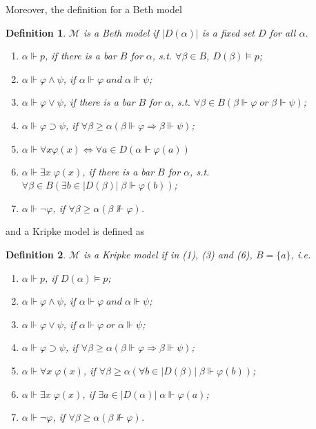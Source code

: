 \documentclass[11pt,a4paper]{article}
\newtheorem{mydef}{Definition}
\newcommand{\lto}{\supset}
\newcommand{\sand}{\; and \;}
\newcommand{\sor}{ \; or \;}
\newcommand{\sto}{\Rightarrow}
\begin{document}
Moreover, the definition for a Beth model
\begin{mydef}
$\mathcal{M}$ is a Beth model if $|D(\alpha)|$ is a fixed set $D$ for all $\alpha$. 
\begin{enumerate}
\item $\alpha \Vdash p$, if there is a bar $B$ for $\alpha$, s.t. $\forall \beta \in B$, $D(\beta) \models p$;
\item $\alpha \Vdash \varphi \land \psi$, if $\alpha \Vdash \varphi \sand \alpha \Vdash  \psi$;
\item $\alpha \Vdash \varphi \lor \psi$,  if there is a bar $B$ for $\alpha$, s.t. $\forall \beta \in B (\beta  \Vdash  \varphi \sor \beta  \Vdash  \psi)$;
\item $\alpha \Vdash \varphi \lto \psi$, if $\forall \beta \geqslant \alpha (\beta \Vdash \varphi \sto \beta \Vdash \psi)$;
\item $\alpha \Vdash \forall x \varphi(x) \Leftrightarrow \forall a \in D (\alpha \Vdash \varphi(a))$
\item $\alpha \Vdash \exists x\; \varphi(x)$, if there is a bar $B$ for $\alpha$, s.t. $\forall \beta \in B (\exists b \in |D(\beta)| \; \beta \Vdash \varphi(b))$;
\item $\alpha \Vdash \neg \varphi$, if $\forall \beta \geqslant \alpha (\beta \nVdash \varphi)$.
\end{enumerate}
\end{mydef}

and a Kripke model is defined as 
\begin{mydef}
$\mathcal{M}$ is a Kripke model if in (1), (3) and (6), $B=\{a\}$, i.e.
\begin{enumerate}
\item $\alpha \Vdash p$, if $D(\alpha) \models p$;
\item $\alpha \Vdash \varphi \land \psi$, if $\alpha \Vdash \varphi \sand \alpha \Vdash  \psi$;
\item $\alpha \Vdash \varphi \lor \psi$, if $\alpha  \Vdash  \varphi \sor \alpha  \Vdash  \psi$;
\item $\alpha \Vdash \varphi \lto \psi$, if $\forall \beta \geqslant \alpha (\beta \Vdash \varphi \sto \beta \Vdash \psi)$;
\item $\alpha \Vdash \forall x\; \varphi(x)$, if $\forall \beta \geqslant \alpha (\forall b \in |D(\beta)| \; \beta \Vdash \varphi(b))$;
\item $\alpha \Vdash \exists x\; \varphi(x)$, if $\exists a \in |D(\alpha)| \; \alpha \Vdash \varphi(a)$;
\item $\alpha \Vdash \neg \varphi$, if $\forall \beta \geqslant \alpha (\beta \nVdash \varphi)$.
\end{enumerate}
\end{mydef}
\end{document}
